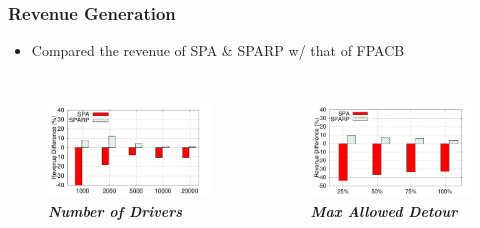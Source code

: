 \documentclass[t]{beamer}
\begin{document}
\begin{frame}\frametitle{Revenue Generation}
\begin{itemize}
\item Compared the revenue of SPA \& SPARP w/ that of FPACB
\end{itemize}
\begin{columns}
\begin{figure}
	\centering
    \includegraphics[width = 0.95\columnwidth]{nd2revdiff}\\
    \small{\textbf{\textit{Number of Drivers}}}
\end{figure}
\begin{figure}
	\centering
    \includegraphics[width = 0.95\columnwidth]{mad2revdiff}\\
    \small{\textbf{\textit{Max Allowed Detour}}}
\end{figure}
\end{columns}
\end{frame}
\end{document}

